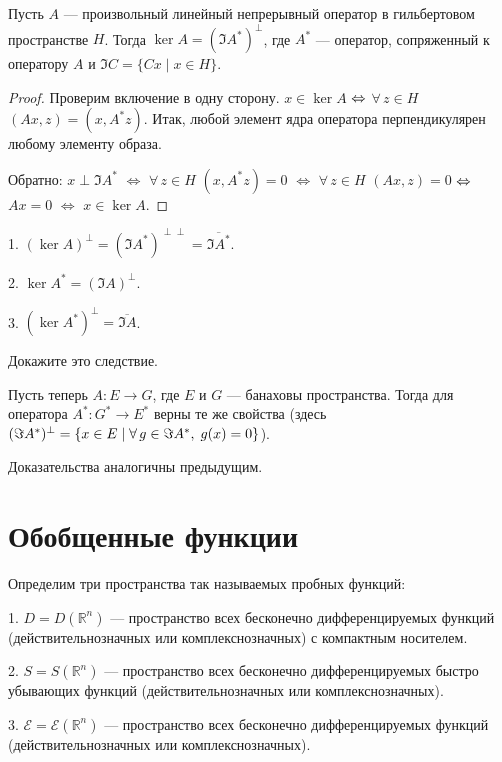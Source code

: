 \documentclass[10pt]{article}
\newcommand*{\p}[1]{#1\nobreak\discretionary{}{\hbox{$\mathsurround=0pt #1$}}{}}
\begin{document}
\begin{theorem}
Пусть $A$ --- произвольный линейный непрерывный оператор в
гильбертовом пространстве $H$. Тогда $\ker A=(\Im A^*)^{\perp}$, где
$A^*$ --- оператор, сопряженный к оператору $A$ и $\Im C=\{Cx\mid
x\in H\}$.
\end{theorem}

\begin{proof}
Проверим включение в одну сторону. $x\in \ker A$ $\p\Leftrightarrow$
$\forall\, z\in H$ \;\;$(Ax,z)=(x,A^*z)$. Итак, любой элемент ядра
оператора перпендикулярен любому элементу образа.

Обратно: $x\perp \Im A^*$ $\Leftrightarrow$ $\forall\, z\in H$\;\;
$(x,A^*z)=0$ $\Leftrightarrow$ $\forall\, z\in H$ \;\;$(Ax,z)=0$
$\p\Leftrightarrow$ $Ax=0$ $\Leftrightarrow$ $x\in \ker A$.
\end{proof}

\begin{imp}
1. $(\ker A)^{\perp}=(\Im A^*)^{\perp\perp}=\overline{\Im A^*}$.

2. $\ker A^*=(\Im A)^{\perp}$.

3. $(\ker A^*)^{\perp}=\overline{\Im A}$.
\end{imp}

\begin{problem}
Докажите это следствие.
\end{problem}

Пусть теперь $A\colon E\to G$, где $E$ и $G$ --- банаховы
пространства. Тогда для оператора $A^*\colon G^*\to E^*$ верны те же
свойства (здесь $(\Im A^*)^{\perp}=\{x\p\in E\mid\forall\, g\p\in
\Im A^*,\; g(x)=0\}$).

Доказательства аналогичны предыдущим.

\section{Обобщенные функции}

Определим три пространства так называемых пробных функций:

1. $D=D(\mathbb{R}^n)$ --- пространство всех бесконечно
дифференцируемых функций (действительнозначных или
комплекснозначных) с компактным носителем.

2. $S=S(\mathbb{R}^n)$ --- пространство всех бесконечно
дифференцируемых быстро убывающих функций (действительнозначных или
комплекснозначных).

3. $\mathcal{E}=\mathcal{E}(\mathbb{R}^n)$ --- пространство всех
бесконечно дифференцируемых функций (действительнозначных или
комплекснозначных).
\end{document}
